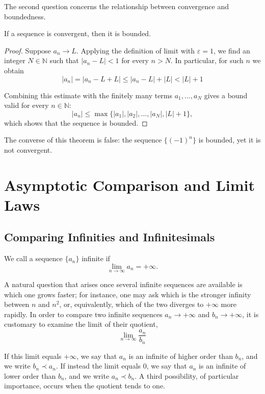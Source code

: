 The second question concerns the relationship between convergence and boundedness.

\begin{theorem}
If a sequence is convergent, then it is bounded.
\end{theorem}

\begin{proof}
Suppose $a_n \to L$. Applying the definition of limit with $\varepsilon = 1$, we find an integer
$N \in \mathbb{N}$ such that $|a_n - L| < 1$ for every $n > N$. In particular, for such $n$ we obtain
\[
|a_n| = |a_n - L + L| \leq |a_n - L| + |L| < |L| + 1
\]

Combining this estimate with the finitely many terms $a_1, \dots, a_N$ gives a bound valid for every $n \in \mathbb{N}$:
\[
|a_n| \leq \max\{|a_1|, |a_2|, \dots, |a_N|, |L| + 1\},
\]
which shows that the sequence is bounded.
\end{proof}

\begin{remark}
The converse of this theorem is false: the sequence $\{(-1)^n\}$ is bounded, yet it is not convergent.
\end{remark}

\section{Asymptotic Comparison and Limit Laws}

\subsection{Comparing Infinities and Infinitesimals}

We call a sequence $\{a_n\}$ infinite if
\[
\lim_{n \to \infty} a_n = +\infty.
\]

A natural question that arises
once several infinite sequences are available is which one grows faster; for instance, one may ask which is the
stronger infinity between $n$ and $n^2$, or, equivalently, which of the two diverges to $+\infty$ more rapidly.
In order to compare two infinite sequences $a_n \to +\infty$ and $b_n \to +\infty$, it is customary to examine
the limit of their quotient,
\[
\lim_{n \to \infty} \frac{a_n}{b_n}
\]

If this limit equals $+\infty$, we say that $a_n$ is an infinite of higher order than $b_n$, and we write
$b_n \prec a_n$. If instead the limit equals $0$, we say that $a_n$ is an infinite of lower order than $b_n$,
and we write $a_n \prec b_n$. A third possibility, of particular importance, occurs when the quotient tends to
one.

